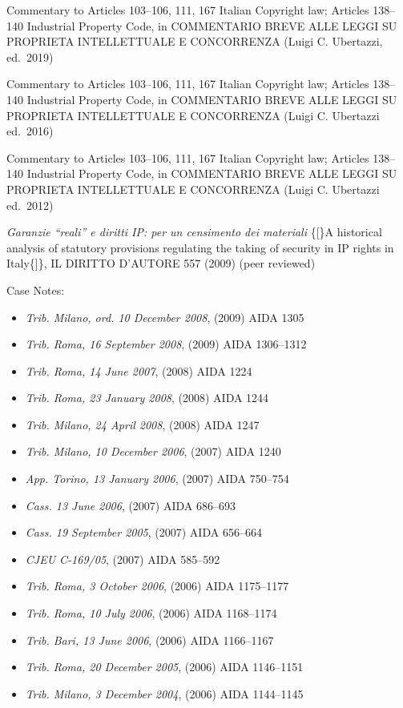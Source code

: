 \documentclass[
  11pt,
  letterpaper]{article}
\begin{document}
\noindent Commentary to Articles 103--106, 111, 167 Italian Copyright
law; Articles 138--140 Industrial Property Code, in
{\fontsize{9.5}{11}\selectfont\MakeUppercase{Commentario Breve Alle Leggi Su Proprieta Intellettuale E Concorrenza}}
(Luigi C. Ubertazzi, ed.~2019)

\vspace{0.5em}\noindent Commentary to Articles 103--106, 111, 167
Italian Copyright law; Articles 138--140 Industrial Property Code, in
{\fontsize{9.5}{11}\selectfont\MakeUppercase{Commentario Breve Alle Leggi Su Proprieta Intellettuale E Concorrenza}}
(Luigi C. Ubertazzi ed.~2016)

\vspace{0.5em}\noindent Commentary to Articles 103--106, 111, 167
Italian Copyright law; Articles 138--140 Industrial Property Code, in
{\fontsize{9.5}{11}\selectfont\MakeUppercase{Commentario Breve Alle Leggi Su Proprieta Intellettuale E Concorrenza}}
(Luigi C. Ubertazzi ed.~2012)

\vspace{0.5em}\noindent\textit{Garanzie ``reali'' e diritti IP: per un censimento dei materiali}
\{{[}\}A historical analysis of statutory provisions regulating the
taking of security in IP rights in Italy\{{]}\},
{\fontsize{9.5}{11}\selectfont\MakeUppercase{Il Diritto D'Autore}} 557
(2009) (peer reviewed)

\vspace{0.3em}

\noindent Case Notes:

\begin{itemize}
\item \textit{Trib. Milano, ord. 10 December 2008}, (2009) AIDA 1305
\item \textit{Trib. Roma, 16 September 2008}, (2009) AIDA 1306--1312
\item \textit{Trib. Roma, 14 June 2007}, (2008) AIDA 1224
\item \textit{Trib. Roma, 23 January 2008}, (2008) AIDA 1244
\item \textit{Trib. Milano, 24 April 2008}, (2008) AIDA 1247
\item \textit{Trib. Milano, 10 December 2006}, (2007) AIDA 1240
\item \textit{App. Torino, 13 January 2006}, (2007) AIDA 750--754
\item \textit{Cass. 13 June 2006}, (2007) AIDA 686--693
\item \textit{Cass. 19 September 2005}, (2007) AIDA 656--664
\item \textit{CJEU C-169/05}, (2007) AIDA 585--592
\item \textit{Trib. Roma, 3 October 2006}, (2006) AIDA 1175--1177
\item \textit{Trib. Roma, 10 July 2006}, (2006) AIDA 1168--1174
\item \textit{Trib. Bari, 13 June 2006}, (2006) AIDA 1166--1167
\item \textit{Trib. Roma, 20 December 2005}, (2006) AIDA 1146--1151
\item \textit{Trib. Milano, 3 December 2004}, (2006) AIDA 1144--1145
\end{itemize}
\end{document}
